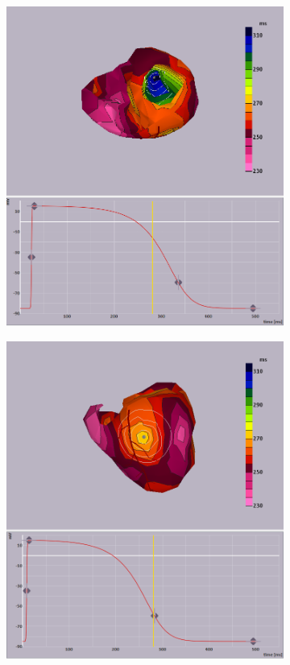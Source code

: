 \documentclass[12pt]{article}
\begin{document}
\begin{figure}[H]
\begin{subfigure}{0.45\textwidth}
		\includegraphics[width = \textwidth]{Figures/EndoADP.png}
		\caption{}
		\label{APD:endo}
	\end{subfigure}
	\begin{subfigure}{0.45\textwidth}
	\centering
	\includegraphics[width = \textwidth]{Figures/ADP_check1.png}

\end{subfigure}
\end{figure}
\end{document}
